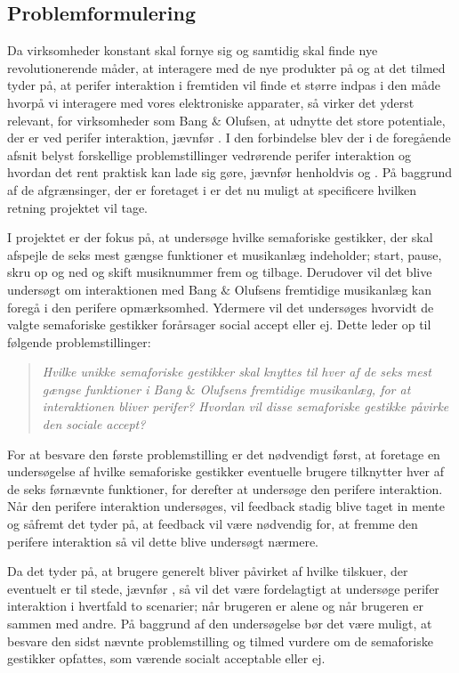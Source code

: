 \subsection{Problemformulering}
\label{Problemformulering}
%
Da virksomheder konstant skal fornye sig og samtidig skal finde nye revolutionerende måder, at interagere med de nye produkter på og at det tilmed tyder på, at perifer interaktion i fremtiden vil finde et større indpas i den måde hvorpå vi interagere med vores elektroniske apparater, så virker det yderst relevant, for virksomheder som Bang $\&$ Olufsen, at udnytte det store potentiale, der er ved perifer interaktion, jævnfør . I den forbindelse blev der i de foregående afsnit belyst forskellige problemstillinger vedrørende perifer interaktion og hvordan det rent praktisk kan lade sig gøre, jævnfør henholdvis  og . På baggrund af de afgrænsinger, der er foretaget i  er det nu muligt at specificere hvilken retning projektet vil tage.  

I projektet er der fokus på, at undersøge hvilke semaforiske gestikker, der skal afspejle de seks mest gængse funktioner et musikanlæg indeholder; start, pause, skru op og ned og skift musiknummer frem og tilbage. Derudover vil det blive undersøgt om interaktionen med Bang $\&$ Olufsens fremtidige musikanlæg kan foregå i den perifere opmærksomhed. Ydermere vil det undersøges hvorvidt de valgte semaforiske gestikker forårsager social accept eller ej. Dette leder op til følgende problemstillinger:\blankline
%
\begin{quotation}
\noindent
\textit{Hvilke unikke semaforiske gestikker skal knyttes til hver af de seks mest gængse funktioner i Bang $\&$ Olufsens fremtidige musikanlæg, for at interaktionen bliver perifer?\blankline
%
Hvordan vil disse semaforiske gestikke påvirke den sociale accept?}\blankline
\end{quotation}
%
For at besvare den første problemstilling er det nødvendigt først, at foretage en undersøgelse af hvilke semaforiske gestikker eventuelle brugere tilknytter hver af de seks førnævnte funktioner, for derefter at undersøge den perifere interaktion. Når den perifere interaktion undersøges, vil feedback stadig blive taget in mente og såfremt det tyder på, at feedback vil være nødvendig for, at fremme den perifere interaktion så vil dette blive undersøgt nærmere.   

Da det tyder på, at brugere generelt bliver påvirket af hvilke tilskuer, der eventuelt er til stede, jævnfør , så vil det være fordelagtigt at undersøge perifer interaktion i hvertfald to scenarier; når brugeren er alene og når brugeren er sammen med andre. På baggrund af den undersøgelse bør det være muligt, at besvare den sidst nævnte problemstilling og tilmed vurdere om de semaforiske gestikker opfattes, som værende socialt acceptable eller ej. 



